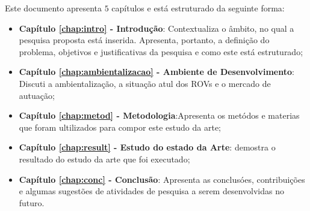 Este documento apresenta $5$ capítulos e está estruturado da seguinte forma:

\begin{itemize}

  \item \textbf{Capítulo \ref{chap:intro} - Introdução}: Contextualiza o âmbito, no qual a pesquisa proposta está inserida. Apresenta, portanto, a definição do problema, objetivos e justificativas da pesquisa e como este \thetypeworkthree está estruturado;
  \item \textbf{Capítulo \ref{chap:ambientalizacao} - Ambiente de Desenvolvimento}: Discuti a ambientalização, a situação atul dos ROVs e o mercado de autuação;
  \item \textbf{Capítulo \ref{chap:metod} - Metodologia}:Apresenta os metódos e materias que foram ultilizados para compor este estudo da arte;
  \item \textbf{Capítulo \ref{chap:result} - Estudo do estado da Arte}: demostra o resultado do estudo da arte que foi executado;
  \item \textbf{Capítulo \ref{chap:conc} - Conclusão}: Apresenta as conclusóes, contribuições e algumas sugestões de atividades de pesquisa a serem desenvolvidas no futuro.

\end{itemize}
